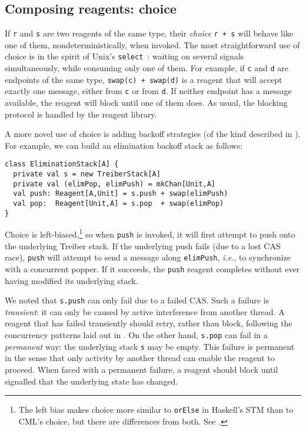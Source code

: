 \documentclass[preprint]{sigplanconf}
\begin{document}

\subsection{Composing reagents: choice}
\label{sec:choice}

If \lstinline{r} and \lstinline{s} are two reagents of the same type,
their \emph{choice} \lstinline{r + s} will behave like one of them,
nondeterministically, when invoked.  The most straightforward use of
choice is in the spirit of Unix's \lstinline{select}~\cite{?}: waiting
on several signals simultaneously, while consuming only one of them.
For example, if \lstinline{c} and \lstinline{d} are endpoints of the
same type, \lstinline{swap(c) + swap(d)} is a reagent that will accept
exactly one message, either from \lstinline{c} or from \lstinline{d}.
If neither endpoint has a message available, the reagent will block
until one of them does.  As usual, the blocking protocol is handled by
the reagent library.

A more novel use of choice is adding backoff strategies (of the kind
described in ).  For example, we can build an elimination
backoff stack as follows:
\begin{lstlisting}
class EliminationStack[A] {
  private val s = new TreiberStack[A]
  private val (elimPop, elimPush) = mkChan[Unit,A]
  val push: Reagent[A,Unit] = s.push + swap(elimPush)
  val pop:  Reagent[Unit,A] = s.pop  + swap(elimPop)
}
\end{lstlisting}
Choice is left-biased,\footnote{The left bias makes choice more
  similar to \lstinline{orElse} in Haskell's STM than to CML's choice,
  but there are differences from both.  See .  } so
when \lstinline{push} is invoked, it will first attempt to push onto
the underlying Treiber stack.  If the underlying push fails (due to a
lost CAS race), \lstinline{push} will attempt to send a message along
\lstinline{elimPush}, \emph{i.e.}, to synchronize with a concurrent
popper.  If it succeeds, the \lstinline{push} reagent completes
without ever having modified its underlying stack.

We noted that \lstinline{s.push} can only fail due to a failed CAS.
Such a failure is \emph{transient}: it can only be caused by active
interference from another thread.  A reagent that has failed
transiently should retry, rather than block, following the concurrency
patterns laid out in .  On the other hand,
\lstinline{s.pop} can fail in a \emph{permanent} way: the underlying
stack \lstinline{s} may be empty.  This failure is permanent in the
sense that only activity by another thread can enable the reagent to
proceed.  When faced with a permanent failure, a reagent should block
until signalled that the underlying state has changed.
\end{document}
